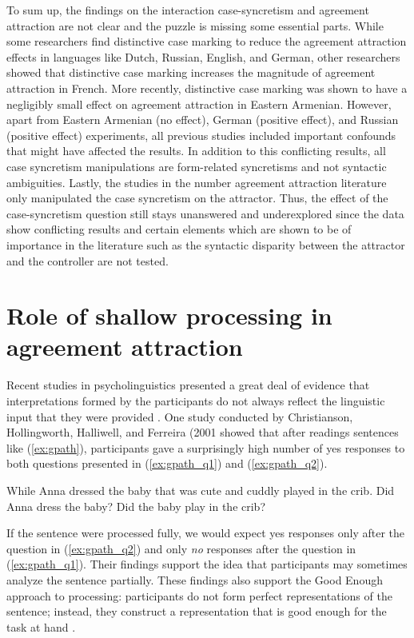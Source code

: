 To sum up, the findings on the interaction case-syncretism and agreement attraction are not clear and the puzzle is missing some essential parts. While some researchers find distinctive case marking to reduce the agreement attraction effects in languages like Dutch, Russian, English, and German, other researchers showed that distinctive case marking increases the magnitude of agreement attraction in French. More recently, distinctive case marking was shown to have a negligibly small effect on agreement attraction in Eastern Armenian. However, apart from Eastern Armenian (no effect), German (positive effect), and Russian (positive effect) experiments, all previous studies included important confounds that might have affected the results. In addition to this conflicting results, all case syncretism manipulations are form-related syncretisms and not syntactic ambiguities. Lastly, the studies in the number agreement attraction literature only manipulated the case syncretism on the attractor. Thus, the effect of the case-syncretism question still stays unanswered and underexplored since the data show conflicting results and certain elements which are shown to be of importance in the literature such as the syntactic disparity between the attractor and the controller are not tested. 





\section{Role of shallow processing in agreement attraction} \label{sec:shallow}

Recent studies in psycholinguistics presented a great deal of evidence that interpretations formed by the participants do not always reflect the linguistic input that they were provided \citep{EricksonMattson81,BartonSanford93,Ferreira2003,Christianson2016}. One study conducted by Christianson, Hollingworth, Halliwell, and Ferreira (2001 showed that after readings sentences like (\ref{ex:gpath}), participants gave a surprisingly high number of yes responses to both questions presented in (\ref{ex:gpath_q1}) and (\ref{ex:gpath_q2}).

\ea \label{ex:gpath} While Anna dressed the baby that was cute and cuddly played in the crib.
\ex 
    \ea \label{ex:gpath_q1} Did Anna dress the baby?
    \ex \label{ex:gpath_q2} Did the baby play in the crib?
    \z
\z

If the sentence were processed fully, we would expect yes responses only after the question in (\ref{ex:gpath_q2}) and only \emph{no} responses after the question in (\ref{ex:gpath_q1}). Their findings support the idea that participants may sometimes analyze the sentence partially. These findings also support the Good Enough approach to processing: participants do not form perfect representations of the sentence; instead, they construct a representation that is good enough for the task at hand \citep{ChristiansonEtAl2001}. 

